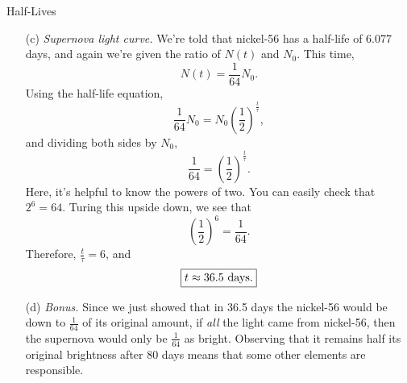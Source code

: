 \documentclass[12pt]{article}
\begin{document}
\begin{probdesc}{6}{Half-Lives}
\begin{enumerate}
\item[(c)] {\em Supernova light curve.}  We're told that nickel-56 has
  a half-life of 6.077 days, and again we're given the ratio of $N(t)$
  and $N_0$.  This time,
\begin{equation}
N(t) = \frac{1}{64} N_0.
\end{equation}
Using the half-life equation,
\begin{equation}
\frac{1}{64} N_0 = N_0 \left(\frac{1}{2}\right)^{\frac{t}{\tau}},
\end{equation}
and dividing both sides by $N_0$,
\begin{equation}
\frac{1}{64} = \left(\frac{1}{2}\right)^{\frac{t}{\tau}}.
\end{equation}
Here, it's helpful to know the powers of two.  You can easily check
that $2^6 = 64$.  Turing this upside down, we see that
\begin{equation}
\left(\frac{1}{2}\right)^6 = \frac{1}{64}.
\end{equation}
Therefore, $\frac{t}{\tau} = 6$, and
\begin{equation}
\boxed{t \approx 36.5 \rm\ days.}
\end{equation}

\item[(d)] {\em Bonus.}  Since we just showed that in 36.5 days the
  nickel-56 would be down to $\frac{1}{64}$ of its original amount, if
  {\em all} the light came from nickel-56, then the supernova would
  only be $\frac{1}{64}$ as bright.  Observing that it remains half
  its original brightness after 80 days means that some other elements
  are responsible.
\end{enumerate}
\end{probdesc}
\end{document}
